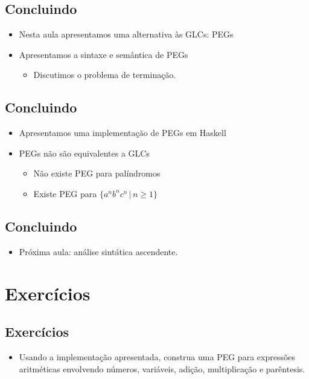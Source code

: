 \documentclass[11pt]{article}
\begin{document}
\subsection*{Concluindo}
\label{sec:orgbe3293c}

\begin{itemize}
\item Nesta aula apresentamos uma alternativa às GLCs: PEGs

\item Apresentamos a sintaxe e semântica de PEGs
\begin{itemize}
\item Discutimos o problema de terminação.
\end{itemize}
\end{itemize}
\subsection*{Concluindo}
\label{sec:orgfcb333c}

\begin{itemize}
\item Apresentamos uma implementação de PEGs em Haskell

\item PEGs não são equivalentes a GLCs
\begin{itemize}
\item Não existe PEG para palíndromos
\item Existe PEG para \(\{a^nb^nc^n\,|\,n\geq 1\}\)
\end{itemize}
\end{itemize}
\subsection*{Concluindo}
\label{sec:org9722d98}

\begin{itemize}
\item Próxima aula: análise sintática ascendente.
\end{itemize}
\section*{Exercícios}
\label{sec:org65d5053}

\subsection*{Exercícios}
\label{sec:org0f375c2}

\begin{itemize}
\item Usando a implementação apresentada, construa uma PEG para expressões aritméticas
envolvendo números, variáveis, adição, multiplicação e parêntesis.
\end{itemize}
\end{document}
